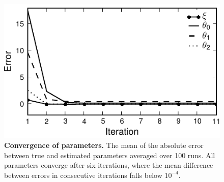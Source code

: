 \documentclass[10pt]{article}
\begin{document}
\begin{figure}[!ht]
\begin{center}
\includegraphics{./Graph/pdf/Figure6.pdf}
\end{center}
\caption{{\bf Convergence of parameters.} The mean of the absolute error between true and estimated parameters averaged over 100 runs. All parameters converge after six iterations, where the mean difference between errors in consecutive iterations falls below $10^{-4}$.}
\label{fig:ParametersConvergence}
\end{figure}
\end{document}
